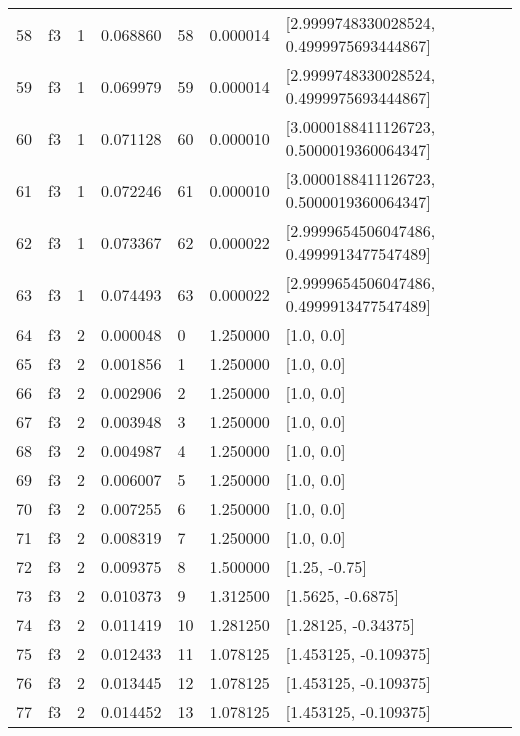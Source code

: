 \begin{tabular}{lllrlrl}
58  &  f3 &   1 &  0.068860 &   58 &  0.000014 &   [2.9999748330028524, 0.4999975693444867] \\
59  &  f3 &   1 &  0.069979 &   59 &  0.000014 &   [2.9999748330028524, 0.4999975693444867] \\
60  &  f3 &   1 &  0.071128 &   60 &  0.000010 &   [3.0000188411126723, 0.5000019360064347] \\
61  &  f3 &   1 &  0.072246 &   61 &  0.000010 &   [3.0000188411126723, 0.5000019360064347] \\
62  &  f3 &   1 &  0.073367 &   62 &  0.000022 &   [2.9999654506047486, 0.4999913477547489] \\
63  &  f3 &   1 &  0.074493 &   63 &  0.000022 &   [2.9999654506047486, 0.4999913477547489] \\
64  &  f3 &   2 &  0.000048 &    0 &  1.250000 &                                 [1.0, 0.0] \\
65  &  f3 &   2 &  0.001856 &    1 &  1.250000 &                                 [1.0, 0.0] \\
66  &  f3 &   2 &  0.002906 &    2 &  1.250000 &                                 [1.0, 0.0] \\
67  &  f3 &   2 &  0.003948 &    3 &  1.250000 &                                 [1.0, 0.0] \\
68  &  f3 &   2 &  0.004987 &    4 &  1.250000 &                                 [1.0, 0.0] \\
69  &  f3 &   2 &  0.006007 &    5 &  1.250000 &                                 [1.0, 0.0] \\
70  &  f3 &   2 &  0.007255 &    6 &  1.250000 &                                 [1.0, 0.0] \\
71  &  f3 &   2 &  0.008319 &    7 &  1.250000 &                                 [1.0, 0.0] \\
72  &  f3 &   2 &  0.009375 &    8 &  1.500000 &                              [1.25, -0.75] \\
73  &  f3 &   2 &  0.010373 &    9 &  1.312500 &                          [1.5625, -0.6875] \\
74  &  f3 &   2 &  0.011419 &   10 &  1.281250 &                        [1.28125, -0.34375] \\
75  &  f3 &   2 &  0.012433 &   11 &  1.078125 &                      [1.453125, -0.109375] \\
76  &  f3 &   2 &  0.013445 &   12 &  1.078125 &                      [1.453125, -0.109375] \\
77  &  f3 &   2 &  0.014452 &   13 &  1.078125 &                      [1.453125, -0.109375] \\

\end{tabular}
